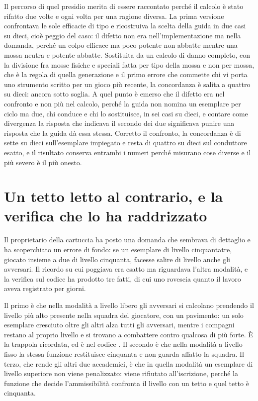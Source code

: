 Il percorso di quel presidio merita di essere raccontato perché il calcolo è stato rifatto due volte e ogni volta per una ragione diversa. La prima versione confrontava le sole efficacie di tipo e ricostruiva la scelta della guida in due casi su dieci, cioè peggio del caso: il difetto non era nell'implementazione ma nella domanda, perché un colpo efficace ma poco potente non abbatte mentre una mossa neutra e potente abbatte. Sostituita da un calcolo di danno completo, con la divisione fra mosse fisiche e speciali fatta per tipo della mossa e non per mossa, che è la regola di quella generazione e il primo errore che commette chi vi porta uno strumento scritto per un gioco più recente, la concordanza è salita a quattro su dieci: ancora sotto soglia. A quel punto è emerso che il difetto era nel confronto e non più nel calcolo, perché la guida non nomina un esemplare per ciclo ma due, chi conduce e chi lo sostituisce, in sei casi su dieci, e contare come divergenza la risposta che indicava il secondo dei due significava punire una risposta che la guida dà essa stessa. Corretto il confronto, la concordanza è di sette su dieci sull'esemplare impiegato e resta di quattro su dieci sul conduttore esatto, e il risultato conserva entrambi i numeri perché misurano cose diverse e il più severo è il più onesto.

\section{Un tetto letto al contrario, e la verifica che lo ha raddrizzato}

Il proprietario della cartuccia ha posto una domanda che sembrava di dettaglio e ha scoperchiato un errore di fondo: se un esemplare di livello cinquantatre, giocato insieme a due di livello cinquanta, facesse salire di livello anche gli avversari. Il ricordo su cui poggiava era esatto ma riguardava l'altra modalità, e la verifica sul codice ha prodotto tre fatti, di cui uno rovescia quanto il lavoro aveva registrato per giorni.

Il primo è che nella modalità a livello libero gli avversari si calcolano prendendo il livello più alto presente nella squadra del giocatore, con un pavimento: un solo esemplare cresciuto oltre gli altri alza tutti gli avversari, mentre i compagni restano al proprio livello e si trovano a combattere contro qualcosa di più forte. È la trappola ricordata, ed è nel codice \cite{pokeemerald}. Il secondo è che nella modalità a livello fisso la stessa funzione restituisce cinquanta e non guarda affatto la squadra. Il terzo, che rende gli altri due accademici, è che in quella modalità un esemplare di livello superiore non viene penalizzato: viene rifiutato all'iscrizione, perché la funzione che decide l'ammissibilità confronta il livello con un tetto e quel tetto è cinquanta.

